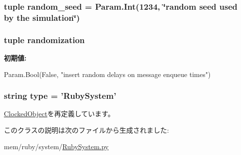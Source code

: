 \label{classRubySystem_1_1RubySystem_af8a467f812c4e782637454bb5b504cc9}
\hypertarget{classRubySystem_1_1RubySystem_acf19a71d62a3b6e155d68d47a18e7df5}{
\subsubsection[{random\_\-seed}]{\setlength{\rightskip}{0pt plus 5cm}tuple random\_\-seed = Param.Int(1234, \char`\"{}random seed used by the simulation\char`\"{})}}
\label{classRubySystem_1_1RubySystem_acf19a71d62a3b6e155d68d47a18e7df5}
\hypertarget{classRubySystem_1_1RubySystem_a58cb283ff2d96c6de2c91d47c5baed68}{
\subsubsection[{randomization}]{\setlength{\rightskip}{0pt plus 5cm}tuple randomization}}
\label{classRubySystem_1_1RubySystem_a58cb283ff2d96c6de2c91d47c5baed68}
{\bfseries 初期値:}
\begin{DoxyCode}
Param.Bool(False,
        "insert random delays on message enqueue times")
\end{DoxyCode}
\hypertarget{classRubySystem_1_1RubySystem_acce15679d830831b0bbe8ebc2a60b2ca}{
\subsubsection[{type}]{\setlength{\rightskip}{0pt plus 5cm}string type = '{\bf RubySystem}'}}
\label{classRubySystem_1_1RubySystem_acce15679d830831b0bbe8ebc2a60b2ca}


\hyperlink{classClockedObject_1_1ClockedObject_acce15679d830831b0bbe8ebc2a60b2ca}{ClockedObject}を再定義しています。

このクラスの説明は次のファイルから生成されました:\begin{DoxyCompactItemize}
\item 
mem/ruby/system/\hyperlink{RubySystem_8py}{RubySystem.py}\end{DoxyCompactItemize}
